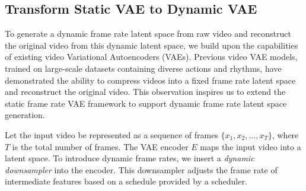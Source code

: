 

\subsection{Transform Static VAE to Dynamic VAE}



To generate a dynamic frame rate latent space from raw video and reconstruct the original video from this dynamic latent space, we build upon the capabilities of existing video Variational Autoencoders (VAEs). Previous video VAE models, trained on large-scale datasets containing diverse actions and rhythms, have demonstrated the ability to compress videos into a fixed frame rate latent space and reconstruct the original video. This observation inspires us to extend the static frame rate VAE framework to support dynamic frame rate latent space generation.


Let the input video be represented as a sequence of frames \( \{x_1, x_2, \dots, x_T\} \), where \( T \) is the total number of frames. The VAE encoder \( E \) maps the input video into a latent space. To introduce dynamic frame rates, we insert a \textit{dynamic downsampler} into the encoder. This downsampler adjusts the frame rate of intermediate features based on a schedule provided by a scheduler. 

